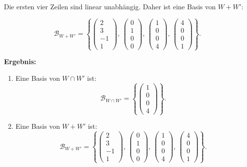 \documentclass[11pt]{article}
\begin{document}
Die ersten vier Zeilen sind linear unabhängig. Daher ist eine Basis von \( W + W' \):

\[
\mathcal{B}_{W + W'} = \left\{
\begin{pmatrix} 2 \\ 3 \\ -1 \\ 1 \end{pmatrix}, \,
\begin{pmatrix} 0 \\ 1 \\ 0 \\ 0 \end{pmatrix}, \,
\begin{pmatrix} 1 \\ 0 \\ 0 \\ 4 \end{pmatrix}, \,
\begin{pmatrix} 4 \\ 0 \\ 0 \\ 1 \end{pmatrix}
\right\}.
\]

\textbf{Ergebnis:}
\begin{enumerate}
    \item Eine Basis von \( W \cap W' \) ist:
    \[
    \mathcal{B}_{W \cap W'} = \left\{ \begin{pmatrix} 1 \\ 0 \\ 0 \\ 4 \end{pmatrix} \right\}.
    \]
    \item Eine Basis von \( W + W' \) ist:
    \[
    \mathcal{B}_{W + W'} = \left\{
    \begin{pmatrix} 2 \\ 3 \\ -1 \\ 1 \end{pmatrix}, \,
    \begin{pmatrix} 0 \\ 1 \\ 0 \\ 0 \end{pmatrix}, \,
    \begin{pmatrix} 1 \\ 0 \\ 0 \\ 4 \end{pmatrix}, \,
    \begin{pmatrix} 4 \\ 0 \\ 0 \\ 1 \end{pmatrix}
    \right\}.
    \]
\end{enumerate}
\end{document}
